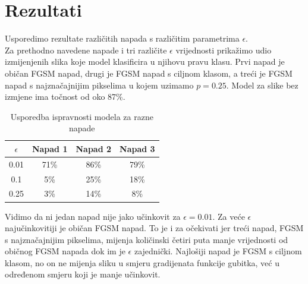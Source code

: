 \section{Rezultati}

Usporedimo rezultate različitih napada s različitim parametrima $\epsilon$. \\

Za prethodno navedene napade i tri različite $\epsilon$ vrijednosti prikažimo udio izmijenjenih slika koje model klasificira u njihovu pravu klasu. Prvi napad je običan FGSM napad, drugi je FGSM napad s ciljnom klasom, a treći je FGSM napad s najznačajnijim pikselima u kojem uzimamo $p = 0.25$. Model za slike bez izmjene ima točnost od oko 87\%.

\begin{table}[H]
	\centering
	\begin{tabular}{||c || c | c | c||} 
		\hline
		$\epsilon$ & Napad 1 & Napad 2 & Napad 3 \\ [0.5ex] 
		\hline\hline
		0.01 & 71\% & 86\% & 79\% \\ 
		0.1 & 5\% & 25\% & 18\% \\
		0.25 & 3\% & 14\% & 8\% \\ [1ex] 
		\hline
	\end{tabular}
	\caption{Usporedba ispravnosti modela za razne napade}
\end{table}

Vidimo da ni jedan napad nije jako učinkovit za $\epsilon = 0.01$. Za veće $\epsilon$ najučinkovitiji je običan FGSM napad. To je i za očekivati jer treći napad, FGSM s najznačajnijim pikselima, mijenja količinski četiri puta manje vrijednosti od običnog FGSM napada dok im je $\epsilon$ zajednički. Najlošiji napad je FGSM s ciljnom klasom, no on ne mijenja sliku u smjeru gradijenata funkcije gubitka, već u određenom smjeru koji je manje učinkovit.